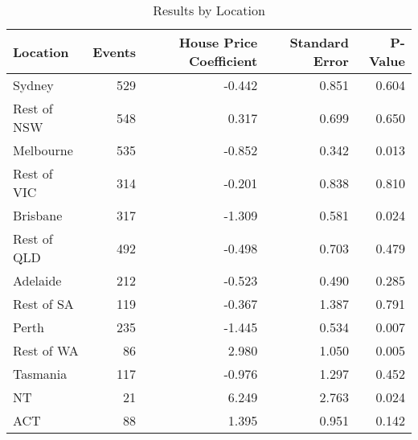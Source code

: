 \begin{table}[htpb]
\centering
\caption{Results by Location} 
\label{ModLoc}
\begin{tabular}{lrrrr}
  \toprule
\parbox[t]{0.15\textwidth}{\centering Location} & \parbox[t]{0.11\textwidth}{\centering Events} & \parbox[t]{0.15\textwidth}{\centering House Price Coefficient} & \parbox[t]{0.11\textwidth}{\centering Standard Error} & \parbox[t]{0.11\textwidth}{\centering P-Value} \\ 
  \midrule
Sydney & 529 & -0.442 & 0.851 & 0.604 \\ 
  Rest of NSW & 548 & 0.317 & 0.699 & 0.650 \\ 
  Melbourne & 535 & -0.852 & 0.342 & 0.013 \\ 
  Rest of VIC & 314 & -0.201 & 0.838 & 0.810 \\ 
  Brisbane & 317 & -1.309 & 0.581 & 0.024 \\ 
  Rest of QLD & 492 & -0.498 & 0.703 & 0.479 \\ 
  Adelaide & 212 & -0.523 & 0.490 & 0.285 \\ 
  Rest of SA & 119 & -0.367 & 1.387 & 0.791 \\ 
  Perth & 235 & -1.445 & 0.534 & 0.007 \\ 
  Rest of WA & 86 & 2.980 & 1.050 & 0.005 \\ 
  Tasmania & 117 & -0.976 & 1.297 & 0.452 \\ 
  NT & 21 & 6.249 & 2.763 & 0.024 \\ 
  ACT & 88 & 1.395 & 0.951 & 0.142 \\ 
   \bottomrule
\end{tabular}
\end{table}
